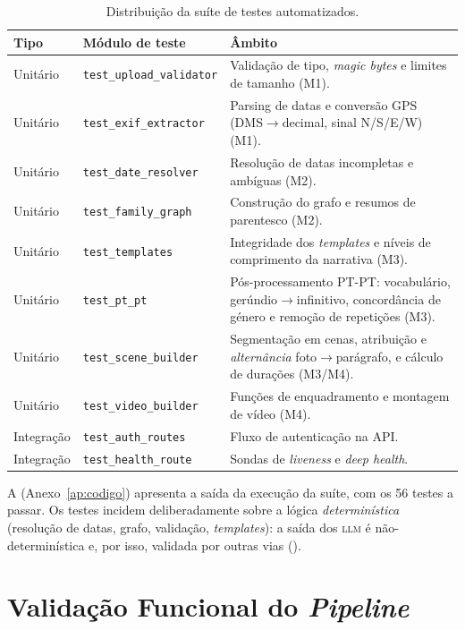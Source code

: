 \begin{table}[H]
\centering
\caption{Distribuição da suíte de testes automatizados.}
\label{tab:testes}
\small
\begin{tabularx}{\linewidth}{@{}llp{6.4cm}@{}}
\toprule
\textbf{Tipo} & \textbf{Módulo de teste} & \textbf{Âmbito} \\
\midrule
Unitário    & \texttt{test\_upload\_validator} & Validação de tipo, \emph{magic bytes} e limites de tamanho (M1). \\
Unitário    & \texttt{test\_exif\_extractor} & Parsing de datas e conversão GPS (DMS$\rightarrow$decimal, sinal N/S/E/W) (M1). \\
Unitário    & \texttt{test\_date\_resolver}  & Resolução de datas incompletas e ambíguas (M2). \\
Unitário    & \texttt{test\_family\_graph}   & Construção do grafo e resumos de parentesco (M2). \\
Unitário    & \texttt{test\_templates}       & Integridade dos \emph{templates} e níveis de comprimento da narrativa (M3). \\
Unitário    & \texttt{test\_pt\_pt}          & Pós-processamento PT-PT: vocabulário, gerúndio$\rightarrow$infinitivo, concordância de género e remoção de repetições (M3). \\
Unitário    & \texttt{test\_scene\_builder}  & Segmentação em cenas, atribuição e \emph{alternância} foto$\rightarrow$parágrafo, e cálculo de durações (M3/M4). \\
Unitário    & \texttt{test\_video\_builder}  & Funções de enquadramento e montagem de vídeo (M4). \\
Integração  & \texttt{test\_auth\_routes}    & Fluxo de autenticação na API. \\
Integração  & \texttt{test\_health\_route}   & Sondas de \emph{liveness} e \emph{deep health}. \\
\bottomrule
\end{tabularx}
\end{table}

A  (Anexo~\ref{ap:codigo}) apresenta a saída da execução da
suíte, com os 56 testes a passar. Os testes incidem deliberadamente sobre a
lógica \emph{determinística} (resolução de datas, grafo, validação,
\emph{templates}): a saída dos \textsc{llm} é não-determinística e, por isso,
validada por outras vias ().

\section{Validação Funcional do \emph{Pipeline}}
\label{sec:validacao_funcional}

